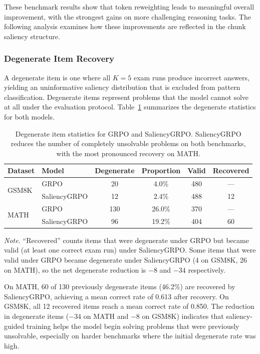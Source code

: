 \documentclass[12pt]{report}
\begin{document}
These benchmark results show that token reweighting leads to meaningful overall improvement, with the strongest gains on more challenging reasoning tasks. The following analysis examines how these improvements are reflected in the chunk saliency structure.

\subsubsection{Degenerate Item Recovery}

A degenerate item is one where all $K=5$ exam runs produce incorrect answers, yielding
an uninformative saliency distribution that is excluded from pattern classification.
Degenerate items represent problems that the model cannot solve at all under the evaluation protocol.
Table~\ref{tab:degenerate-recovery} summarizes the degenerate statistics for both models.

\begin{table}[t]
\centering
\caption{Degenerate item statistics for GRPO and SaliencyGRPO.  SaliencyGRPO reduces the number
of completely unsolvable problems on both benchmarks, with the most pronounced recovery on MATH.}
\label{tab:degenerate-recovery}
\begin{tabular}{llcccc}
\toprule
\textbf{Dataset} & \textbf{Model} & \textbf{Degenerate} & \textbf{Proportion} & \textbf{Valid} & \textbf{Recovered} \\
\midrule
\multirow{2}{*}{GSM8K}
  & GRPO          & 20  & 4.0\%  & 480 & --- \\
  & SaliencyGRPO  & 12  & 2.4\%  & 488 & 12 \\
\midrule
\multirow{2}{*}{MATH}
  & GRPO          & 130 & 26.0\% & 370 & --- \\
  & SaliencyGRPO  & 96  & 19.2\% & 404 & 60 \\
\bottomrule
\end{tabular}
\vspace{4pt}

\raggedright\small
\textit{Note.}  ``Recovered'' counts items that were degenerate under GRPO but became valid (at least one
correct exam run) under SaliencyGRPO.  Some items that were valid under GRPO became
degenerate under SaliencyGRPO (4 on GSM8K, 26 on MATH), so the net degenerate reduction is
$-8$ and $-34$ respectively.
\end{table}

On MATH, 60 of 130 previously degenerate items (46.2\%) are recovered by SaliencyGRPO,
achieving a mean correct rate of 0.613 after recovery.  On GSM8K, all 12 recovered items reach a mean correct rate of 0.850.  
The reduction in degenerate items ($-34$ on MATH and $-8$ on GSM8K) indicates that saliency-guided training helps the model begin solving problems that were previously unsolvable, especially on harder benchmarks where the initial degenerate rate was high.
\end{document}
